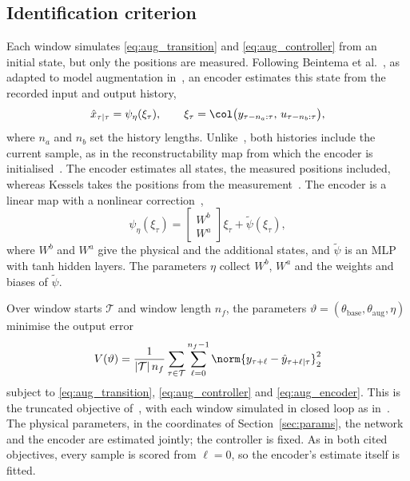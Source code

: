 \subsection{Identification criterion}\label{sec:aug_objective}
Each window simulates \eqref{eq:aug_transition} and
\eqref{eq:aug_controller} from an initial state, but only the positions are
measured.
Following Beintema et al.~\cite{beintema2023subnet}, as adapted to model
augmentation in~\cite[Eq.~(22e)]{hoekstra2026lfr}, an encoder estimates this
state from the recorded input and output history,
\begin{equation}
 \hat x_{\tau|\tau}
 =\psi_\eta(\xi_\tau),\qquad
 \xi_\tau=\col\bigl(y_{\tau-n_a:\tau},\,u_{\tau-n_b:\tau}\bigr),
 \label{eq:aug_encoder}
\end{equation}
where $n_a$ and $n_b$ set the history lengths.
Unlike~\cite[Eq.~(22e)]{hoekstra2026lfr}, both histories include the current
sample, as in the reconstructability map from which the encoder is
initialised~\cite[Eq.~(15)]{hoekstra2026encoder}.
The encoder estimates all states, the measured positions included, whereas
Kessels takes the positions from the
measurement~\cite[Remark~5.3]{kessels2025ai}.
The encoder is a linear map with a nonlinear
correction~\cite[Eq.~(8)]{hoekstra2026encoder},
\begin{equation}
 \psi_\eta(\xi_\tau)
 =\begin{bmatrix}W^b\\ W^a\end{bmatrix}\xi_\tau+\tilde\psi(\xi_\tau),
 \label{eq:aug_enc_lin}
\end{equation}
where $W^b$ and $W^a$ give the physical and the additional states, and
$\tilde\psi$ is an MLP with tanh hidden layers.
The parameters $\eta$ collect $W^b$, $W^a$ and the weights and biases of
$\tilde\psi$.

Over window starts $\mathcal T$ and window length $n_f$, the parameters
$\vartheta=(\theta_{\mathrm{base}},\theta_{\mathrm{aug}},\eta)$ minimise the
output error
\begin{equation}
 V(\vartheta)=\frac{1}{|\mathcal T|\,n_f}
 \sum_{\tau\in\mathcal T}\sum_{\ell=0}^{n_f-1}
 \norm{y_{\tau+\ell}-\hat y_{\tau+\ell|\tau}}_2^2
 \label{eq:aug_loss}
\end{equation}
subject to \eqref{eq:aug_transition}, \eqref{eq:aug_controller} and
\eqref{eq:aug_encoder}.
This is the truncated objective of~\cite[Eq.~(22)]{hoekstra2026lfr}, with
each window simulated in closed loop as in~\cite[Eq.~(5.12)]{kessels2025ai}.
The physical parameters, in the coordinates of Section~\ref{sec:params},
the network and the encoder are estimated jointly; the controller is fixed.
As in both cited objectives, every sample is scored from $\ell=0$, so the
encoder's estimate itself is fitted.

